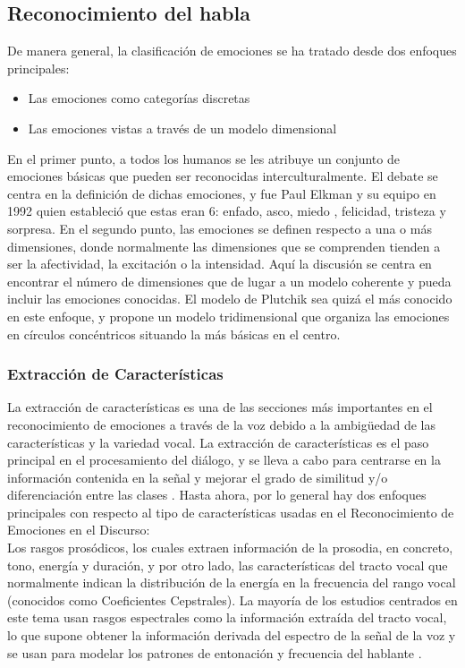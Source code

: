 \documentclass[11pt,a4paper,spanish]{book}
\begin{document}
	\subsection{Reconocimiento del habla}
	De manera general, la clasificación de emociones se ha tratado desde dos enfoques principales:
	\begin{itemize}
		\item Las emociones como categorías discretas
		\item Las emociones vistas a través de un modelo dimensional
	\end{itemize}

	En el primer punto, a todos los humanos se les atribuye un conjunto de emociones básicas que pueden ser reconocidas interculturalmente. El debate se centra en la definición de dichas emociones, y fue Paul Elkman y su equipo en 1992 \cite{Ekman1992} quien estableció que estas eran 6: enfado, asco, miedo , felicidad, tristeza y sorpresa.
	En el segundo punto, las emociones se definen respecto a una o más dimensiones, donde normalmente las dimensiones que se comprenden tienden a ser la afectividad, la excitación o la intensidad. Aquí la discusión se centra en encontrar el número de dimensiones que de lugar a un modelo coherente y pueda incluir las emociones conocidas. El modelo de Plutchik \cite{Plutchik2001} sea quizá el más conocido en este enfoque, y propone un modelo tridimensional que organiza las emociones en círculos concéntricos situando la más básicas en el centro. \hfill \break

	\subsubsection{Extracción de Características}
	La extracción de características es una de las secciones más importantes en el reconocimiento de emociones a través de la voz debido a la ambigüedad de las características y la variedad vocal. La extracción de características es el paso principal en el procesamiento del diálogo, y se lleva a cabo para centrarse en la información contenida en la señal y mejorar el grado de similitud y/o diferenciación entre las clases \cite{Hellbernd2016}. Hasta ahora, por lo general hay dos enfoques principales  con respecto al tipo de características usadas en el Reconocimiento de Emociones en el Discurso:\\
	Los rasgos prosódicos, los cuales extraen información de la prosodia, en concreto, tono, energía y duración, y por otro lado, las características del tracto vocal que normalmente indican la distribución de la energía en la frecuencia del rango vocal (conocidos como Coeficientes Cepstrales).
	La mayoría de los estudios centrados en este tema usan rasgos espectrales como la información extraída del tracto vocal, lo que supone obtener la información derivada del espectro de la señal de la voz y se usan para modelar los patrones de entonación y frecuencia del hablante \cite{Langari2020}.\\
	
\end{document}
